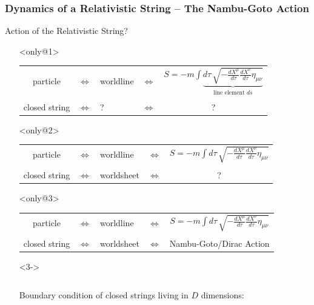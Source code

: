 \documentclass[aspectratio=169]{beamer}
\begin{document}
	\begin{frame}[t]
		\frametitle{Dynamics of a Relativistic String -- The Nambu-Goto Action}
		Action of the Relativistic String?
		\begin{itemize}
			\item[]<only@1>
			\begin{center}
				\begin{tabular}{ccp{1.8cm}cc}
					particle & $\Leftrightarrow$ & worldline & $\Leftrightarrow$ & ${\displaystyle S = -m \int } \underbrace{d\tau \,\sqrt{-\frac{dX^\mu}{d\tau} \frac{dX^\nu}{d\tau}\eta_{\mu\nu}} }_{\text{line element }ds} $ \\[0.7cm]
					&&&&\\
					closed string & $\Leftrightarrow$ &\hphantom{worl} ? \hphantom{heet}& $\Leftrightarrow$ & ? \\
				\end{tabular}
			\end{center}
			\item[]<only@2>
			\begin{center}
				\begin{tabular}{ccp{1.8cm}cc}
					particle & $\Leftrightarrow$ & worldline & $\Leftrightarrow$ & ${\displaystyle S = -m \int d\tau \,\sqrt{-\frac{dX^\mu}{d\tau} \frac{dX^\nu}{d\tau}\eta_{\mu\nu}} }$ \\[0.7cm]
					&&&&\\
					closed string & $\Leftrightarrow$ & worldsheet & $\Leftrightarrow$ & ? \\
				\end{tabular}
			\end{center}
			\item[]<only@3>
			\begin{center}
				\begin{tabular}{ccp{1.8cm}cc}
					particle & $\Leftrightarrow$ & worldline & $\Leftrightarrow$ & ${\displaystyle S = -m \int d\tau \,\sqrt{-\frac{dX^\mu}{d\tau} \frac{dX^\nu}{d\tau}\eta_{\mu\nu}} }$ \\[0.7cm]
					&&&&\\
					closed string & $\Leftrightarrow$ & worldsheet & $\Leftrightarrow$ & Nambu-Goto/Dirac Action \\
				\end{tabular}
			\end{center}
			\item[]<3->
			\begin{columns}
				\begin{column}{0.8\textwidth}
					Boundary condition of closed strings living in $D$ dimensions:

\end{column}
\end{columns}
\end{itemize}
\end{frame}
\end{document}
